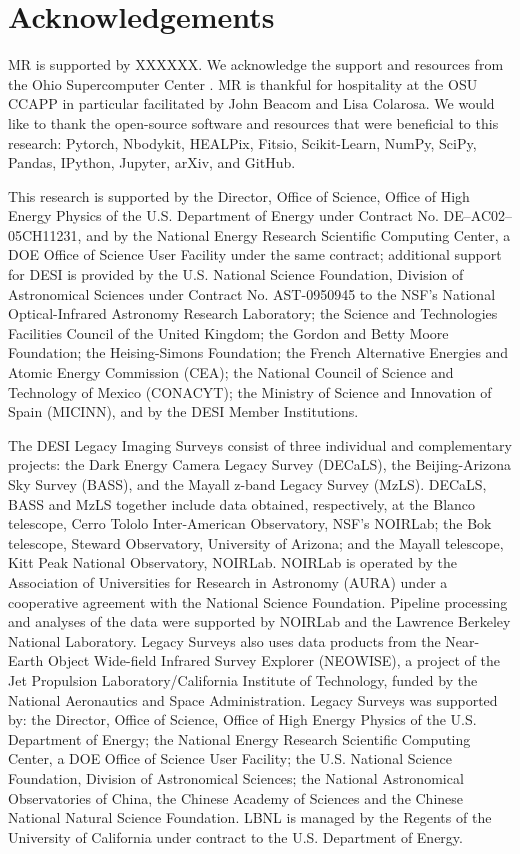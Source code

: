 \section*{Acknowledgements}
MR is supported by XXXXXX. We acknowledge the support and resources from the Ohio Supercomputer Center \citep[OSC;][]{OhioSupercomputerCenter1987}. MR is thankful for hospitality at the OSU CCAPP in particular facilitated by John Beacom and Lisa Colarosa. We would like to thank the open-source software and resources that were beneficial to this research: Pytorch, Nbodykit, HEALPix, Fitsio, Scikit-Learn, NumPy, SciPy, Pandas, IPython, Jupyter, arXiv, and GitHub. 


This research is supported by the Director, Office of Science, Office of High Energy Physics of the U.S. Department of Energy under Contract No. DE–AC02–05CH11231, and by the National Energy Research Scientific Computing Center, a DOE Office of Science User Facility under the same contract; additional support for DESI is provided by the U.S. National Science Foundation, Division of Astronomical Sciences under Contract No. AST-0950945 to the NSF’s National Optical-Infrared Astronomy Research Laboratory; the Science and Technologies Facilities Council of the United Kingdom; the Gordon and Betty Moore Foundation; the Heising-Simons Foundation; the French Alternative Energies and Atomic Energy Commission (CEA); the National Council of Science and Technology of Mexico (CONACYT); the Ministry of Science and Innovation of Spain (MICINN), and by the DESI Member Institutions.

The DESI Legacy Imaging Surveys consist of three individual and complementary projects: the Dark Energy Camera Legacy Survey (DECaLS), the Beijing-Arizona Sky Survey (BASS), and the Mayall z-band Legacy Survey (MzLS). DECaLS, BASS and MzLS together include data obtained, respectively, at the Blanco telescope, Cerro Tololo Inter-American Observatory, NSF’s NOIRLab; the Bok telescope, Steward Observatory, University of Arizona; and the Mayall telescope, Kitt Peak National Observatory, NOIRLab. NOIRLab is operated by the Association of Universities for Research in Astronomy (AURA) under a cooperative agreement with the National Science Foundation. Pipeline processing and analyses of the data were supported by NOIRLab and the Lawrence Berkeley National Laboratory. Legacy Surveys also uses data products from the Near-Earth Object Wide-field Infrared Survey Explorer (NEOWISE), a project of the Jet Propulsion Laboratory/California Institute of Technology, funded by the National Aeronautics and Space Administration. Legacy Surveys was supported by: the Director, Office of Science, Office of High Energy Physics of the U.S. Department of Energy; the National Energy Research Scientific Computing Center, a DOE Office of Science User Facility; the U.S. National Science Foundation, Division of Astronomical Sciences; the National Astronomical Observatories of China, the Chinese Academy of Sciences and the Chinese National Natural Science Foundation. LBNL is managed by the Regents of the University of California under contract to the U.S. Department of Energy. 

